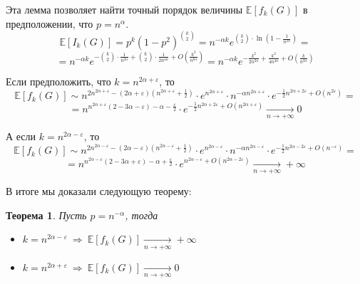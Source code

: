 \documentclass[a4paper]{article}
\newtheorem*{mtheorem}{Теорема}
\begin{document}
	Эта лемма позволяет найти точный порядок величины $\mathbb{E}[f_k(G)]$ в предположении, что $p = n^\alpha$.
	$$\mathbb{E}[I_k(G)] = p^k(1-p^2)^{\binom{k}{2}} = n^{-\alpha k}e^{\binom{k}{2}\cdot\ln\left(1-\frac{1}{n^{2\alpha}}\right)} = $$
	$$ = n^{-\alpha k}e^{-\binom{k}{2}\cdot\frac{1}{n^{2\alpha}} + \binom{k}{2}\cdot\frac{1}{2n^{4\alpha}}+ 
	O\left(\frac{k^2}{n^{6\alpha}}\right)} = n^{-\alpha k}e^{-\frac{k^2}{2n^{2\alpha}} + \frac{k^2}{4n^{4\alpha}} + 
	O\left(\frac{k}{n^{2\alpha}}\right)}$$
	
	Если предположить, что $k = n^{2\alpha + \varepsilon}$, то $$\mathbb{E}[f_k(G)] \sim n^{2n^{2\alpha + \varepsilon} -
	(2\alpha + \varepsilon)(n^{2\alpha + \varepsilon} + \frac{1}{2})}\cdot e^{n^{2\alpha + \varepsilon}}\cdot 
	n^{-\alpha n^{2\alpha+\varepsilon}}\cdot e^{-\frac{1}{2}n^{2\alpha + 2\varepsilon} + O\left(n^{2\varepsilon}\right)} = $$
	$$ = n^{n^{2\alpha + \varepsilon}(2 - 3\alpha - \varepsilon) - \alpha - \frac{\varepsilon}{2}}\cdot 
	e^{-\frac{1}{2}n^{2\alpha + 2\varepsilon} + O\left(n^{2\alpha + \varepsilon}\right)}\xrightarrow[n \to +\infty]{} 0$$
	
	А если $k = n^{2\alpha - \varepsilon}$, то $$\mathbb{E}[f_k(G)] \sim n^{2n^{2\alpha - \varepsilon} - 
	(2\alpha - \varepsilon)(n^{2\alpha - \varepsilon} + \frac{1}{2})}\cdot e^{n^{2\alpha - \varepsilon}}\cdot 
	n^{-\alpha n^{2\alpha-\varepsilon}}\cdot e^{-\frac{1}{2}n^{2\alpha - 2\varepsilon} + O\left(n^{-\varepsilon}\right)} = $$
	$$ = n^{n^{2\alpha - \varepsilon}(2 - 3\alpha +\varepsilon) - \alpha + \frac{\varepsilon}{2}}\cdot 
	e^{n^{2\alpha - \varepsilon}+O(n^{2\alpha - 2\varepsilon})}\xrightarrow[n \to +\infty]{} +\infty$$

	В итоге мы доказали следующую теорему:
	\begin{mtheorem}
	    Пусть $p = n^{-\alpha}$, тогда 
	    \begin{itemize}
	        \item $k = n^{2\alpha - \varepsilon}\ \Longrightarrow\ \mathbb{E}[f_k(G)]\xrightarrow[n \to +\infty]{} +\infty$
	        \item $k = n^{2\alpha + \varepsilon}\ \Longrightarrow\ \mathbb{E}[f_k(G)]\xrightarrow[n \to +\infty]{} 0$
	    \end{itemize}

	\end{mtheorem}





\end{document}
